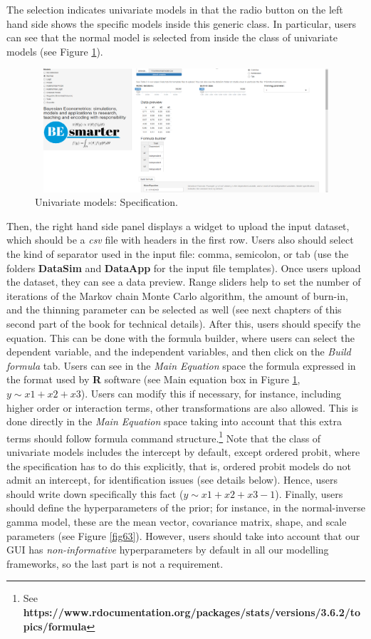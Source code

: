 The selection indicates univariate models in that the radio button on the left hand side shows the specific models inside this generic class. In particular, users can see that the normal model is selected from inside the class of univariate models (see Figure \ref{fig62}).

\begin{figure}
	\includegraphics[width=340pt, height=130pt]{Chapters/chapterGUI/figures/Figure2.png}
	\caption[List of figure caption goes here]{Univariate models: Specification.}\label{fig62}
\end{figure}

Then, the right hand side panel displays a widget to upload the input dataset, which should be a \textit{csv} file with headers in the first row. Users also should select the kind of separator used in the input file: comma, semicolon, or tab (use the folders \textbf{DataSim} and \textbf{DataApp} for the input file templates). Once users upload the dataset, they can see a data preview. Range sliders help to set the number of iterations of the Markov chain Monte Carlo algorithm, the amount of burn-in, and the thinning parameter can be selected as well (see next chapters of this second part of the book for technical details). After this, users should specify the equation. This can be done with the formula builder, where users can select the dependent variable, and the independent variables, and then click on the \textit{Build formula} tab. Users can see in the \textit{Main Equation} space the formula expressed in the format used by \textbf{R} software (see Main equation box in Figure \ref{fig62}, $y\sim x1+x2+x3$). Users can modify this if necessary, for instance, including higher order or interaction terms, other transformations are also allowed. This is done directly in the \textit{Main Equation} space taking into account that this extra terms should follow formula command structure.\footnote{See \textbf{https://www.rdocumentation.org/packages/stats/versions/3.6.2/topics/formula}} Note that the class of univariate models includes the intercept by default, except ordered probit, where the specification has to do this explicitly, that is, ordered probit models do not admit an intercept, for identification issues (see details below). Hence, users should write down specifically this fact ($y\sim x1+x2+x3-1$). Finally, users should define the hyperparameters of the prior; for instance, in the normal-inverse gamma model, these are the mean vector, covariance matrix, shape, and scale parameters (see Figure \ref{fig63}). However, users should take into account that our GUI has \textit{non-informative} hyperparameters by default in all our modelling frameworks, so the last part is not a requirement.

